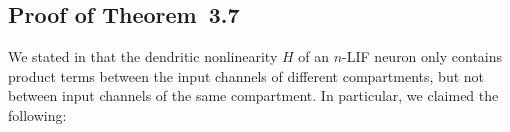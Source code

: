 
\subsection{Proof of Theorem~3.7}
\label{app:nlif_product_terms}

We stated in  that the dendritic nonlinearity $H$ of an $n$-LIF neuron only contains product terms between the input channels of different compartments, but not between input channels of the same compartment.
In particular, we claimed the following:

\ThmNlifProductTerms*

